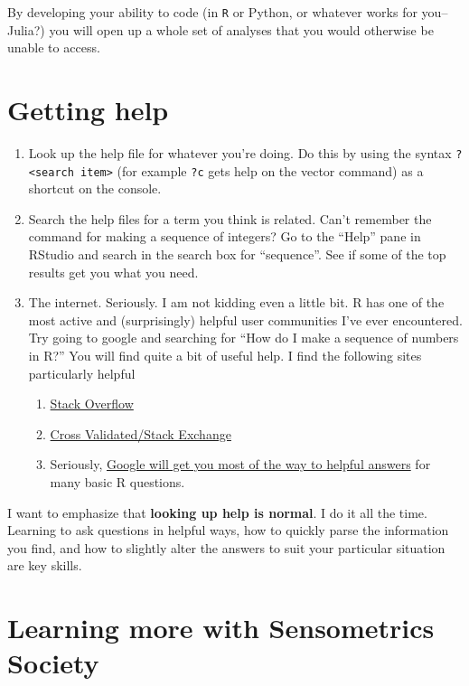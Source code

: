 \documentclass[
]{book}
\providecommand{\tightlist}{%
  \setlength{\itemsep}{0pt}\setlength{\parskip}{0pt}}
\begin{document}
By developing your ability to code (in \texttt{R} or Python, or whatever works for you--Julia?) you will open up a whole set of analyses that you would otherwise be unable to access.

\hypertarget{getting-help-1}{%
\section{Getting help}\label{getting-help-1}}

\begin{enumerate}
\def\labelenumi{\arabic{enumi}.}
\tightlist
\item
  Look up the help file for whatever you're doing. Do this by using the syntax \texttt{?\textless{}search\ item\textgreater{}} (for example \texttt{?c} gets help on the vector command) as a shortcut on the console.
\item
  Search the help files for a term you think is related. Can't remember the command for making a sequence of integers? Go to the ``Help'' pane in RStudio and search in the search box for ``sequence''. See if some of the top results get you what you need.
\item
  The internet. Seriously. I am not kidding even a little bit. R has one of the most active and (surprisingly) helpful user communities I've ever encountered. Try going to google and searching for ``How do I make a sequence of numbers in R?'' You will find quite a bit of useful help. I find the following sites particularly helpful

  \begin{enumerate}
  \def\labelenumii{\arabic{enumii}.}
  \tightlist
  \item
    \href{https://stackoverflow.com/questions/tagged/r}{Stack Overflow}
  \item
    \href{https://stats.stackexchange.com/questions/tagged/r}{Cross Validated/Stack Exchange}
  \item
    Seriously, \href{https://is.gd/80V5zF}{Google will get you most of the way to helpful answers} for many basic R questions.
  \end{enumerate}
\end{enumerate}

I want to emphasize that \textbf{looking up help is normal}. I do it all the time. Learning to ask questions in helpful ways, how to quickly parse the information you find, and how to slightly alter the answers to suit your particular situation are key skills.

\hypertarget{learning-more-with-sensometrics-society}{%
\section{Learning more with Sensometrics Society}\label{learning-more-with-sensometrics-society}}
\end{document}
